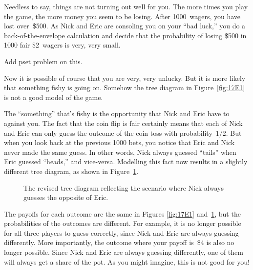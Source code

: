 Needless to say, things are not turning out well for you.  The more
times you play the game, the more money you seem to be losing.  After
1000~wagers, you have lost over~\$500.  As Nick and Eric are consoling
you on your ``bad luck,'' you do a back-of-the-envelope calculation
and decide that the probability of losing \$500 in 1000 fair
\$2~wagers is very, very small.

\begin{editingnotes}
Add pset problem on this.
\end{editingnotes}

\iffalse
using the bounds on the tails of the binomial distribution from
Section~\ref{binomial_distribution_section} NOT BINOMIAL

less than the probability of being being dealt four Aces in poker at
the same moment you are struck by lightning.  Vietnamese Monk waltzing
in and handing you one of those golden disks.  How can this be?
\fi

Now it is possible of course that you are very, very unlucky.  But it
is more likely that something fishy is going on.  Somehow the tree
diagram in Figure~\ref{fig:17E1} is not a good model of the game.

The ``something'' that's fishy is the opportunity that Nick and Eric
have to  against you.  The fact that the
coin flip is fair certainly means that each of Nick and Eric can only
guess the outcome of the coin toss with probability~$1/2$.  But when
you look back at the previous 1000 bets, you notice that Eric and Nick
never made the same guess.  In other words, Nick always guessed
``tails'' when Eric guessed ``heads,'' and vice-versa.  Modelling this
fact now results in a slightly different tree diagram, as shown in
Figure~\ref{fig:17E2}.

\begin{figure}


\caption{The revised tree diagram reflecting the scenario where Nick
  always guesses the opposite of Eric.}

\label{fig:17E2}

\end{figure}

The payoffs for each outcome are the same in Figures \ref{fig:17E1}
and~\ref{fig:17E2}, but the probabilities of the outcomes are
different.  For example, it is no longer possible for all three
players to guess correctly, since Nick and Eric are always guessing
differently.  More importantly, the outcome where your payoff is~\$4
is also no longer possible.  Since Nick and Eric are always guessing
differently, one of them will always get a share of the pot.  As you
might imagine, this is not good for you!

